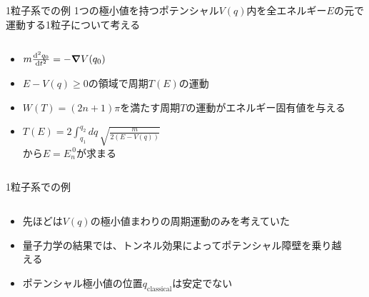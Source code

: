 \documentclass[14pt,aspectratio=169,xcolor=dvipsnames,table,dvipdfmx]{beamer}
\theoremstyle{definition}
\begin{document}
\begin{frame}{1粒子系での例}
  1つの極小値を持つポテンシャル$V(q)$内を全エネルギー$E$の元で運動する1粒子について考える
  \begin{columns}[t]
    \begin{column}{.5\textwidth}
      \begin{itemize}
        \item $m\dv[2]{q_0}{t} = -\grad V(q_0)$
        \item $E-V(q)\geq0$の領域で周期$T(E)$の運動
        \item $W(T)=(2n+1)\pi$を満たす周期$T$の運動がエネルギー固有値を与える
        \item $T(E)=2\int_{q_1}^{q_2}dq\,\sqrt{\frac{m}{2(E-V(q))}}$\\から$E=E_{n}^{~0}$が求まる
      \end{itemize}
    \end{column}
    \begin{column}{.5\textwidth}
    \end{column}
  \end{columns}
\end{frame}

\begin{frame}{1粒子系での例}
  \begin{columns}[t]
    \begin{column}{.5\textwidth}
      \begin{itemize}
        \item 先ほどは$V(q)$の極小値まわりの周期運動のみを考えていた
        \item 量子力学の結果では、トンネル効果によってポテンシャル障壁を乗り越える
        \item ポテンシャル極小値の位置$q_{\text{classical}}$は安定でない
      \end{itemize}
    \end{column}
    \begin{column}{.5\textwidth}
    \end{column}
  \end{columns}
\end{frame}
\end{document}
